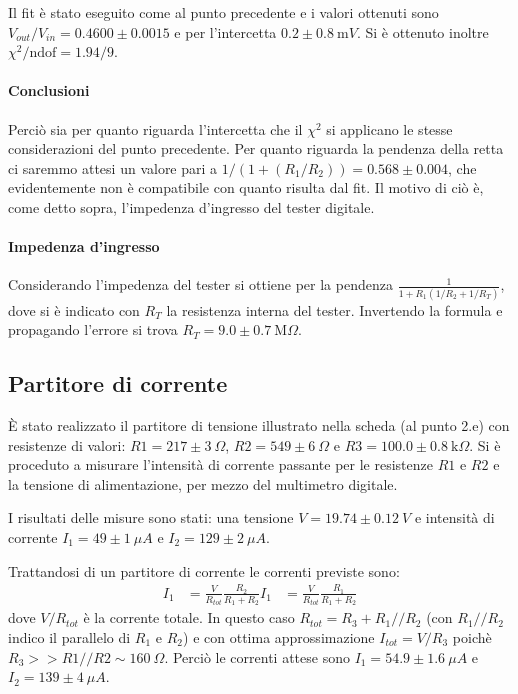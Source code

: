\documentclass[10pt,a4paper]{article}
\newcommand\ohm{\Omega}
\newcommand\K{\text{k}}
\newcommand\M{\text{M}}
\newcommand\m{\text{m}}
\begin{document}
Il fit è stato eseguito come al punto precedente e i valori ottenuti sono $V_{out}/V_{in} = 0.4600 \pm 0.0015$ e per l'intercetta $0.2 \pm 0.8 ~ \m V$. Si è ottenuto inoltre $\chi^2 / \text{ndof} = 1.94 / 9$.

\paragraph{Conclusioni} Perciò sia per quanto riguarda l'intercetta che il $\chi^2$ si applicano le stesse considerazioni del punto precedente. Per quanto riguarda la pendenza della retta ci saremmo attesi un valore pari a  $1/(1+(R_1/R_2))=0.568 \pm 0.004$, che evidentemente non è compatibile con quanto risulta dal fit. Il motivo di ciò è, come detto sopra, l'impedenza d'ingresso del tester digitale.

\paragraph{Impedenza d'ingresso}Considerando l'impedenza del tester si ottiene per la pendenza $\frac{1}{1 + R_1 (1/R_2 + 1/R_T)}$, dove si è indicato con $R_T$ la resistenza interna del tester. Invertendo la formula e propagando l'errore si trova $R_T = 9.0 \pm 0.7 ~ \M\ohm$.

\subsection{Partitore di corrente}
È stato realizzato il partitore di tensione illustrato nella scheda (al punto 2.e) con resistenze di valori: $R1=217 \pm 3 ~\ohm$, $R2=549 \pm 6 ~ \ohm$ e $R3=100.0 \pm 0.8 ~\K\ohm$. Si è proceduto a misurare l'intensità di corrente passante per le resistenze $R1$ e $R2$ e la tensione di alimentazione, per mezzo del multimetro digitale.

I risultati delle misure sono stati: una tensione $V = 19.74 \pm 0.12~ V$ e intensità di corrente $I_1=49 \pm 1 ~\mu A$ e $I_2 = 129 \pm 2 ~ \mu A$. 

Trattandosi di un partitore di corrente le correnti previste sono:
\begin{align}
I_1 &= \frac{V}{R_{tot}}\frac{R_2}{R_1+R_2}
I_1 &= \frac{V}{R_{tot}}\frac{R_1}{R_1+R_2}
\end{align}
dove $V/R_{tot}$ è la corrente totale. In questo caso $R_{tot} = R_3 + R_1//R_2$ (con $R_1//R_2$ indico il parallelo di $R_1$ e $R_2$) e con ottima approssimazione $I_{tot}=V/R_3$ poichè $R_3 >> R1//R2 \sim 160 ~\ohm$.
Perciò le correnti attese sono $I_1 = 54.9 \pm 1.6 ~\mu A$ e $I_2 = 139 \pm 4~ \mu A$.
\end{document}

